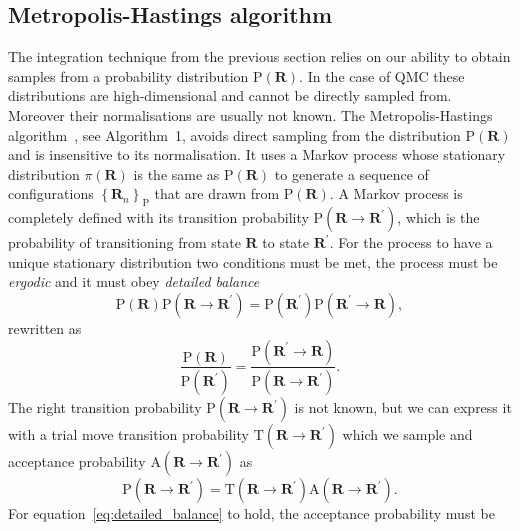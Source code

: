 \documentclass[final,3p,times,twocolumn]{elsarticle}
\begin{document}
	\subsection{Metropolis-Hastings algorithm}
		\label{subsec:Impl-MCMC}
	The integration technique from the previous section relies on our ability to obtain samples from a probability distribution $\mathrm{P}(\mathbf{R})$. In the case of QMC these distributions are high-dimensional and cannot be directly sampled from. Moreover their normalisations are usually not known. 
	The Metropolis-Hastings algorithm~\cite{hastings1970monte}, see Algorithm~1, avoids direct sampling from the distribution $\mathrm{P}(\mathbf{R})$ and is insensitive to its normalisation. It uses a Markov process whose stationary distribution $\pi(\mathbf{R})$ is the same as $\mathrm{P}(\mathbf{R})$	
	to generate a sequence of configurations $\left\{\mathbf{R}_n\right\}_\mathrm{P}$ 
	that are drawn from $\mathrm{P}(\mathbf{R})$. A Markov process is completely defined with its transition probability $\mathrm{P}(\mathbf{R} \rightarrow \mathbf{R}^\prime)$, which is the probability of transitioning from state $\mathbf{R}$ to state $\mathbf{R}^\prime$. For the process to have a unique stationary distribution two conditions must be met, the process must be \emph{ergodic} and it must obey \emph{detailed balance}
	\begin{equation}
		\mathrm{P}(\mathbf{R}) \mathrm P(\mathbf{R} \rightarrow \mathbf{R}^\prime) = \mathrm{P}(\mathbf{R}^\prime) \mathrm P(\mathbf{R}^\prime \rightarrow \mathbf{R}),
	\end{equation}
	rewritten as
	\begin{equation}
		\label{eq:detailed_balance}
		\frac{\mathrm P ({\mathbf{R}})}{\mathrm P ({\mathbf{R}^\prime})} = \frac{\mathrm P(\mathbf{R}^\prime \rightarrow \mathbf{R})}{\mathrm P(\mathbf{R} \rightarrow \mathbf{R}^\prime)}.
	\end{equation}
	The right transition probability $\mathrm P(\mathbf{R} \rightarrow \mathbf{R}^\prime)$ is not known, but we can express it with a trial move transition probability $\mathrm{T}(\mathbf{R} \rightarrow \mathbf{R}^\prime)$ which we sample and acceptance probability $\mathrm{A}(\mathbf{R} \rightarrow \mathbf{R}^\prime)$ as
	\begin{equation}
		\mathrm P(\mathbf{R} \rightarrow \mathbf{R}^\prime) = \mathrm T(\mathbf{R} \rightarrow \mathbf{R}^\prime) \mathrm A(\mathbf{R} \rightarrow \mathbf{R}^\prime).
	\end{equation}
	For equation~\eqref{eq:detailed_balance} to hold, the acceptance probability must be 
\end{document}
